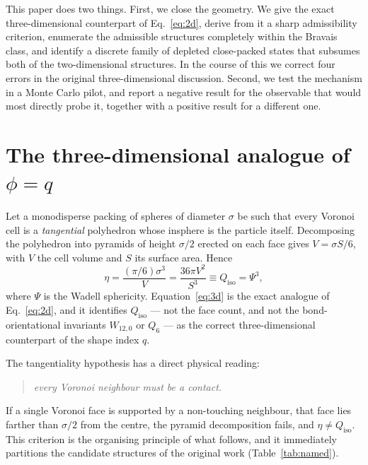 \documentclass[11pt]{article}
\begin{document}
This paper does two things. First, we close the geometry. We give the exact
three-dimensional counterpart of Eq.~\eqref{eq:2d}, derive from it a sharp
admissibility criterion, enumerate the admissible structures completely within
the Bravais class, and identify a discrete family of depleted close-packed
states that subsumes both of the two-dimensional structures. In the course of
this we correct four errors in the original three-dimensional discussion.
Second, we test the mechanism in a Monte Carlo pilot, and report a negative
result for the observable that would most directly probe it, together with a
positive result for a different one.

\section{The three-dimensional analogue of $\phi=q$}
\label{sec:theorem}

Let a monodisperse packing of spheres of diameter $\sigma$ be such that every
Voronoi cell is a \emph{tangential} polyhedron whose insphere is the particle
itself. Decomposing the polyhedron into pyramids of height $\sigma/2$ erected on
each face gives $V=\sigma S/6$, with $V$ the cell volume and $S$ its surface
area. Hence
\begin{equation}
\eta = \frac{(\pi/6)\sigma^3}{V} = \frac{36\pi V^2}{S^3}
     \equiv Q_{\mathrm{iso}} = \Psi^3,
\label{eq:3d}
\end{equation}
where $\Psi$ is the Wadell sphericity. Equation~\eqref{eq:3d} is the exact
analogue of Eq.~\eqref{eq:2d}, and it identifies $Q_{\mathrm{iso}}$ --- not the
face count, and not the bond-orientational invariants $W_{12,0}$ or $Q_6$ --- as
the correct three-dimensional counterpart of the shape index $q$.

The tangentiality hypothesis has a direct physical reading:
\begin{quote}
\emph{every Voronoi neighbour must be a contact.}
\end{quote}
If a single Voronoi face is supported by a non-touching neighbour, that face lies
farther than $\sigma/2$ from the centre, the pyramid decomposition fails, and
$\eta \neq Q_{\mathrm{iso}}$. This criterion is the organising principle of what
follows, and it immediately partitions the candidate structures of the original
work (Table~\ref{tab:named}).
\end{document}
